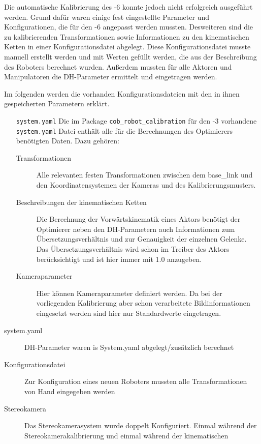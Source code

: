 Die automatische Kalibrierung des -6 konnte jedoch nicht erfolgreich
ausgeführt werden.  Grund dafür waren einige fest eingestellte Parameter und
Konfigurationen, die für den -6 angepasst werden mussten. Desweiteren
sind die zu kalibrierenden Transformationen sowie Informationen zu den
kinematischen Ketten in einer Konfigurationsdatei abgelegt. Diese
Konfigurationsdatei musste manuell erstellt werden und mit Werten gefüllt
werden, die aus der Beschreibung des Roboters berechnet wurden. Außerdem
mussten für alle Aktoren und Manipulatoren die \ac{DH-Parameter} ermittelt und
eingetragen werden.

Im folgenden werden die vorhanden Konfigurationsdateien mit den in ihnen
gespeicherten Parametern erklärt.
\begin{itemize}

  \item[\texttt{system.yaml} ] Die im Package \texttt{cob\_robot\_calibration}
    für den -3 vorhandene \texttt{system.yaml} Datei enthält alle für die
    Berechnungen des Optimierers benötigten Daten. Dazu gehören:

    \begin{description}

      \item[Transformationen] Alle relevanten festen Transformationen zwischen
        dem base\_link  und den
        Koordinatensystemen der Kameras und des Kalibrierungsmusters.

      \item[Beschreibungen der kinematischen Ketten] Die Berechnung der
        Vorwärtskinematik eines Aktors benötigt der Optimierer neben den
        \acl{DH-Parameter}n auch Informationen zum Übersetzungsverhältnis und
        zur Genauigkeit der einzelnen Gelenke. Das Übersetzungsverhältnis wird
        schon im Treiber des Aktors berücksichtigt und ist hier immer mit 1.0
        anzugeben.

      \item[Kameraparameter] Hier können Kameraparameter definiert werden. Da
        bei der vorliegenden Kalibrierung aber schon verarbeitete
        Bildinformationen eingesetzt werden sind hier nur Standardwerte
        eingetragen.

    \end{description}

\end{itemize}

\begin{description}

  \item[system.yaml]DH-Parameter waren is System.yaml abgelegt/zusätzlich
    berechnet

  \item[Konfigurationsdatei] Zur Konfiguration eines neuen Roboters mussten
    alle Transformationen von Hand eingegeben werden

  \item[Stereokamera] Das Stereokamerasystem wurde doppelt Konfiguriert. Einmal
    während der Stereokamerakalibrierung und einmal während der kinematischen

\end{description}

